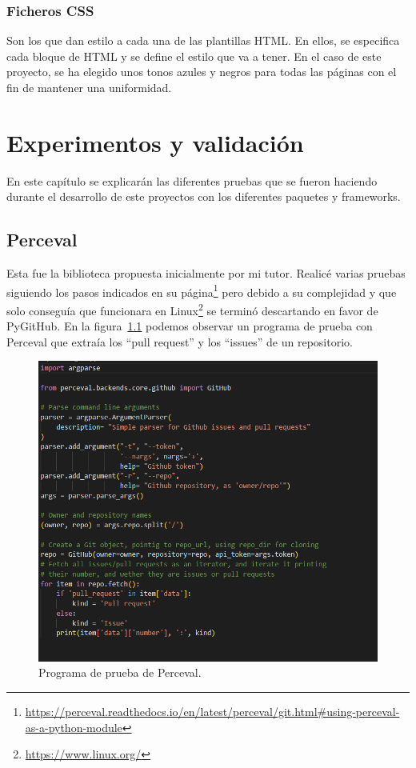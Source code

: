 \documentclass[a4paper, 12pt]{book}
\begin{document}
\subsection{Ficheros CSS}
Son los que dan estilo a cada una de las plantillas HTML. En ellos, se especifica cada bloque de HTML y se define el estilo que va a tener. En el caso de este proyecto, se ha elegido unos tonos azules y negros para todas las páginas con el fin de mantener una uniformidad.

\cleardoublepage
\chapter{Experimentos y validación}
\label{chap:experimentos}
En este capítulo se explicarán las diferentes pruebas que se fueron haciendo durante el desarrollo de este proyectos con los diferentes paquetes y frameworks.
\section{Perceval}
Esta fue la biblioteca propuesta inicialmente por mi tutor. Realicé varias pruebas siguiendo los pasos indicados en su página\footnote{\url{https://perceval.readthedocs.io/en/latest/perceval/git.html#using-perceval-as-a-python-module}} pero debido a su complejidad y que solo conseguía que funcionara en Linux\footnote{\url{https://www.linux.org/}} se terminó descartando en favor de PyGitHub. En la figura~\ref{fig:perceval} podemos observar un programa de prueba con Perceval que extraía los ``pull request'' y los ``issues'' de un repositorio.
\begin{figure}
    \centering
    \includegraphics[width=1\textwidth, keepaspectratio]{img/perceval.png}
    \caption{Programa de prueba de Perceval.}\label{fig:perceval}
\end{figure}
\end{document}
